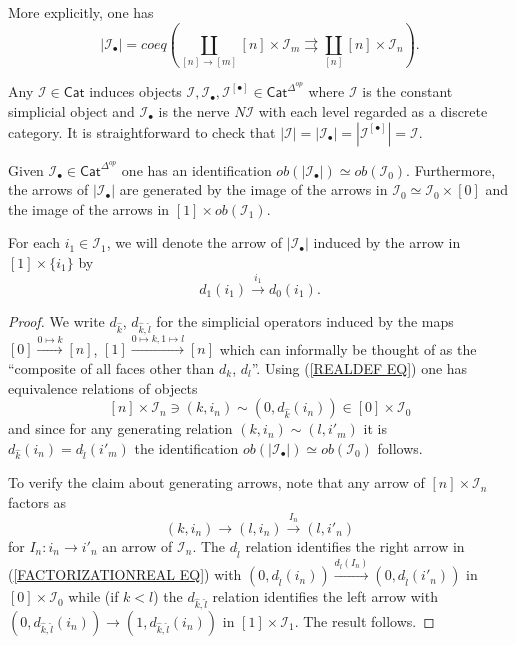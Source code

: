 \documentclass[a4paper,10pt]{article}%
\begin{document}
\begin{remark}
More explicitly, one has
\begin{equation}\label{REALDEF EQ}
	 |\mathcal{I}_{\bullet}| =
	 coeq \left(\coprod_{[n] \to [m]}
	 [n] \times \mathcal{I}_m
	 	\rightrightarrows
	 \coprod_{[n]} [n] \times \mathcal{I}_n
	 \right).
\end{equation}
\end{remark}

\begin{example}
Any $\mathcal{I} \in \mathsf{Cat}$ induces objects 
$\mathcal{I},\mathcal{I}_{\bullet},\mathcal{I}^{[\bullet]} \in \mathsf{Cat}^{\Delta^{op}}$ 
where $\mathcal{I}$ is the constant simplicial object and $\mathcal{I}_{\bullet}$ is the nerve $N \mathcal{I}$ with each level regarded as a discrete category.
It is straightforward to check that 
$|\mathcal{I}|=|\mathcal{I}_{\bullet}| =
|\mathcal{I}^{[\bullet]}| = \mathcal{I}$.
\end{example}


\begin{lemma}\label{OBJGENREL LEMMA}
	Given $\mathcal{I}_{\bullet} \in \mathsf{Cat}^{\Delta^{op}}$ one has an identification
	$ob(|\mathcal{I}_{\bullet}|) \simeq ob(\mathcal{I}_0)$.
	Furthermore, the arrows of $|\mathcal{I}_{\bullet}|$ are generated by the image of the arrows in $\mathcal{I}_0 \simeq \mathcal{I}_0 \times [0]$ and the image of the arrows in 
	$[1] \times ob(\mathcal{I}_1)$.
\end{lemma}

For each $i_1 \in \mathcal{I}_1$, we will denote the arrow of 
$|\mathcal{I}_{\bullet}|$ induced by the arrow in $[1] \times \{i_1\}$ by
\[d_1(i_1) \xrightarrow{i_1} d_0(i_1).\]


\begin{proof}
	We write $d_{\hat{k}}$, $d_{\hat{k},\hat{l}}$ for the simplicial operators induced by the maps 
	$[0]\xrightarrow{0 \mapsto k} [n]$,
	$[1]\xrightarrow{0 \mapsto k,1 \mapsto l} [n]$
	which can informally be thought of as the ``composite of all faces other than $d_k$, $d_l$''.
Using (\ref{REALDEF EQ}) one has equivalence relations of objects  
\[ [n] \times \mathcal{I}_n \ni (k,i_n) \sim (0,d_{\hat{k}}(i_n))
\in [0] \times \mathcal{I}_0 \]
and since for any generating relation $(k,i_n)\sim (l,i'_m)$
it is $d_{\hat{k}}(i_n) = d_{\hat{l}}(i'_m)$ the identification 
$ob(|\mathcal{I}_{\bullet}|) \simeq ob(\mathcal{I}_0)$
follows.


To verify the claim about generating arrows, note that any arrow of $[n]\times \mathcal{I}_n$ factors as 
\begin{equation}\label{FACTORIZATIONREAL EQ}
(k,i_n) \to (l,i_n)  \xrightarrow{I_n} (l,i'_n)
\end{equation}
for $I_n \colon i_n \to i'_n$
an arrow of $\mathcal{I}_n$. 
The $d_{\hat{l}}$ relation identifies the right arrow in 
(\ref{FACTORIZATIONREAL EQ})
with
$(0,d_{\hat{l}}(i_n))
	\xrightarrow{d_{\hat{l}}(I_n)}
(0,d_{\hat{l}}(i'_n))
$
in $[0]\times \mathcal{I}_0$
while (if $k<l$) the $d_{\hat{k},\hat{l}}$ relation identifies the left arrow with 
$(0,d_{\hat{k},\hat{l}}(i_n)) \to (1,d_{\hat{k},\hat{l}}(i_n))$
in $[1]\times \mathcal{I}_1$. The result follows.
\end{proof}
\end{document}
